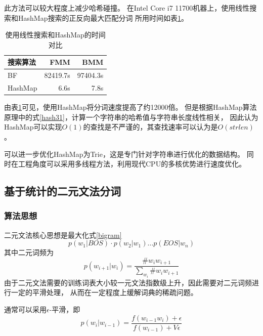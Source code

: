 此方法可以较大程度上减少哈希碰撞\citep{bajracharyareview}。
在Intel Core i7 11700机器上，使用线性搜索和HashMap搜索的正反向最大匹配分词
所用时间如表\ref{plain_vs_hashmap_time}。

\begin{table}[H]
  \centering
  \begin{tabular}{lrr}
    \hline
    \textbf{搜索算法} & \textbf{FMM} & \textbf{BMM} \\
    \hline
    BF                & 82419.7s     & 97404.3s     \\
    HashMap           & 6.6s         & 7.8s         \\
    \hline
  \end{tabular}
  \caption{使用线性搜索和HashMap的时间对比}
  \label{plain_vs_hashmap_time}
\end{table}

由表\ref{plain_vs_hashmap_time}可见，使用HashMap将分词速度提高了约12000倍。
但是根据HashMap算法原理中的式\ref{hash31}，计算一个字符串的哈希值与字符串长度线性相关，
因此认为HashMap可以实现$O(1)$的查找是不严谨的，其查找速率可以认为是$O(strlen)$。

可以进一步优化HashMap为Trie，这是专门针对字符串进行优化的数据结构\citep{bodon2003trie}。
同时在工程角度可以采用多线程方法，利用现代CPU的多核优势进行速度优化。

\subsection{基于统计的二元文法分词}

\subsubsection{算法思想}

二元文法核心思想是最大化式\ref{bigram}
\begin{equation}
  p\left(w_1|BOS\right) \cdot p\left(w_2|w_1\right) \ldots p\left(EOS|w_n\right)
  \label{bigram}
\end{equation}
其中二元词频为
\begin{equation}
  p\left(w_{i+1}|w_i\right) = \dfrac{\# w_i w_{i+1}}{\sum_{w_i} \# w_i w_{i+1}}
\end{equation}
由于二元文法需要的训练词表大小较一元文法指数级上升，因此需要对二元词频进行一定的平滑处理，
从而在一定程度上缓解词典的稀疏问题。

通常可以采用$\epsilon$-平滑，即
\begin{equation}
  p(w_i|w_{i-1})=\dfrac{f(w_{i-1} w_i)+\epsilon}{f(w_{i-1})+V \epsilon}
\end{equation}

